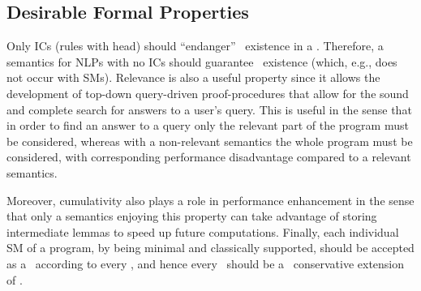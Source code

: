 \documentclass{llncs}
\begin{document}
		\subsection{Desirable Formal Properties}\label{subsec:desirableproperties}
			Only ICs (rules with  head) should ``endanger'' \m\ existence in a \lp.
			Therefore, a semantics for NLPs with no ICs should guarantee \m\ existence (which, e.g., does not occur with SMs).
			Relevance is also a useful property since it allows the development of top-down query-driven proof-procedures that allow for the
			sound and complete search for answers to a user's query.
			This is useful in the sense that in order to find an answer to a query only the relevant part of the program must be considered, whereas
			with a non-relevant semantics 
the whole program must be considered, with corresponding performance disadvantage compared
			to a relevant semantics.
			
			
			Moreover, cumulativity also plays a role in performance enhancement in the sense that only a semantics enjoying this property can take 
			advantage of storing intermediate lemmas to speed up future computations.
			Finally, each individual SM of a program, by being minimal and classically supported, should be accepted as a \m\ according to
			every \twovs, and hence every \twovs\ should be a \m\ conservative extension of \SMs.
\end{document}
